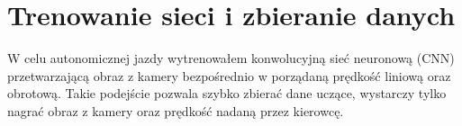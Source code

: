 \chapter{Trenowanie sieci i zbieranie danych}
W celu autonomicznej jazdy wytrenowałem konwolucyjną sieć neuronową (CNN)
przetwarzającą obraz z kamery bezpośrednio w porządaną prędkość liniową
oraz obrotową. Takie podejście pozwala szybko zbierać dane uczące, wystarczy
tylko nagrać obraz z kamery oraz prędkość nadaną przez kierowcę.
\begin{figure}[h]
  \centering
\end{figure}
